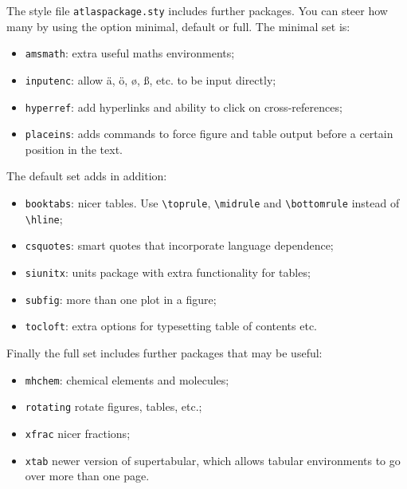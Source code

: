 \documentclass[UKenglish]{latex/atlasdoc}
\newcommand{\Macro}[1]{\texttt{\textbackslash #1}\xspace}
\newcommand{\Option}[1]{\textsf{#1}\xspace}
\begin{document}
The style file \texttt{atlaspackage.sty} includes further packages.
You can steer how many by using the option \Option{minimal}, \Option{default} or \Option{full}.
The minimal set is:
\begin{itemize}\setlength{\parskip}{0pt}\setlength{\itemsep}{0pt}
\item \texttt{amsmath}: extra useful maths environments;
\item \texttt{inputenc}: allow ä, ö, ø, ß, etc. to be input directly;
\item \texttt{hyperref}: add hyperlinks and ability to click on cross-references;
\item \texttt{placeins}: adds commands to force figure and table output before a certain position in the text.
\end{itemize}

The default set adds in addition:
\begin{itemize}\setlength{\parskip}{0pt}\setlength{\itemsep}{0pt}
\item \texttt{booktabs}: nicer tables. Use \Macro{toprule}, \Macro{midrule} and \Macro{bottomrule} instead of \Macro{hline};
\item \texttt{csquotes}: smart quotes that incorporate language dependence;
\item \texttt{siunitx}: units package with extra functionality for tables;
\item \texttt{subfig}: more than one plot in a figure;
\item \texttt{tocloft}: extra options for typesetting table of contents etc.
\end{itemize}

Finally the full set includes further packages that may be useful:
\begin{itemize}\setlength{\parskip}{0pt}\setlength{\itemsep}{0pt}
\item \texttt{mhchem}: chemical elements and molecules;
\item \texttt{rotating} rotate figures, tables, etc.;
\item \texttt{xfrac} nicer fractions;
\item \texttt{xtab} newer version of supertabular, which allows tabular environments to go over more than one page.
\end{itemize}
\end{document}
